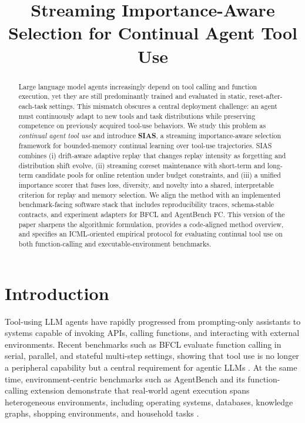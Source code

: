 \documentclass{article}
\title{Streaming Importance-Aware Selection for Continual Agent Tool Use}
\begin{document}

\printAffiliationsAndNotice{}

\begin{abstract}
Large language model agents increasingly depend on tool calling and function execution, yet they are still predominantly trained and evaluated in static, reset-after-each-task settings. This mismatch obscures a central deployment challenge: an agent must continuously adapt to new tools and task distributions while preserving competence on previously acquired tool-use behaviors. We study this problem as \emph{continual agent tool use} and introduce \textbf{SIAS}, a streaming importance-aware selection framework for bounded-memory continual learning over tool-use trajectories. SIAS combines (i) drift-aware adaptive replay that changes replay intensity as forgetting and distribution shift evolve, (ii) streaming coreset maintenance with short-term and long-term candidate pools for online retention under budget constraints, and (iii) a unified importance scorer that fuses loss, diversity, and novelty into a shared, interpretable criterion for replay and memory selection. We align the method with an implemented benchmark-facing software stack that includes reproducibility traces, schema-stable contracts, and experiment adapters for BFCL and AgentBench FC. This version of the paper sharpens the algorithmic formulation, provides a code-aligned method overview, and specifies an ICML-oriented empirical protocol for evaluating continual tool use on both function-calling and executable-environment benchmarks.
\end{abstract}

\section{Introduction}

Tool-using LLM agents have rapidly progressed from prompting-only assistants to systems capable of invoking APIs, calling functions, and interacting with external environments. Recent benchmarks such as BFCL evaluate function calling in serial, parallel, and stateful multi-step settings, showing that tool use is no longer a peripheral capability but a central requirement for agentic LLMs \citep{patil2025bfcl}. At the same time, environment-centric benchmarks such as AgentBench and its function-calling extension demonstrate that real-world agent execution spans heterogeneous environments, including operating systems, databases, knowledge graphs, shopping environments, and household tasks \citep{liu2023agentbench,agentbenchfc2025}.
\end{document}
